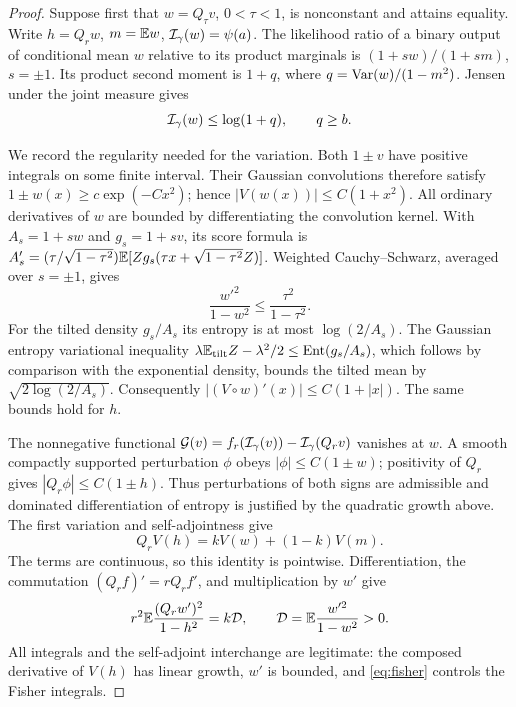 \begin{proof}
Suppose first that $w=Q_\tau v$, $0<\tau<1$, is nonconstant and
attains equality. Write $h=Q_rw$, $m=\mathbb E w$, $\mathcal I_\gamma(w)=\psi(a)$.
The likelihood ratio of a binary output of conditional mean $w$ relative
to its product marginals is $(1+sw)/(1+sm)$, $s=\pm1$.
Its product second moment is $1+q$, where
$q=\operatorname{Var}(w)/(1-m^2)$. Jensen under the joint measure gives
\begin{equation}\label{eq:likelihood}
 \mathcal I_\gamma(w)\le\log(1+q),\qquad q\ge b.
\end{equation}

We record the regularity needed for the variation. Both $1\pm v$ have
positive integrals on some finite interval. Their Gaussian convolutions
therefore satisfy $1\pm w(x)\ge c\exp(-Cx^2)$; hence
$|V(w(x))|\le C(1+x^2)$. All ordinary derivatives of $w$ are bounded
by differentiating the convolution kernel. With $A_s=1+sw$ and
$g_s=1+sv$, its score formula is
$A_s'=(\tau/\sqrt{1-\tau^2})\mathbb E[Zg_s(\tau x+\sqrt{1-\tau^2}Z)]$.
Weighted Cauchy--Schwarz, averaged over $s=\pm1$, gives
\begin{equation}\label{eq:fisher}
 \frac{w'^2}{1-w^2}\le\frac{\tau^2}{1-\tau^2}.
\end{equation}
For the tilted density $g_s/A_s$ its entropy is at most
$\log(2/A_s)$. The Gaussian entropy variational inequality
$\lambda\mathbb E_{\rm tilt}Z-\lambda^2/2\le\operatorname{Ent}(g_s/A_s)$,
which follows by comparison with the exponential density, bounds the
tilted mean by $\sqrt{2\log(2/A_s)}$.
Consequently $|(V\circ w)'(x)|\le C(1+|x|)$.
The same bounds hold for $h$.

The nonnegative functional
$\mathcal G(v)=f_r(\mathcal I_\gamma(v))-\mathcal I_\gamma(Q_rv)$ vanishes at $w$.
A smooth compactly supported perturbation $\phi$ obeys
$|\phi|\le C(1\pm w)$; positivity of $Q_r$ gives
$|Q_r\phi|\le C(1\pm h)$. Thus perturbations of both signs are
admissible and dominated differentiation of entropy is justified by the
quadratic growth above. The first variation and self-adjointness give
\begin{equation}\label{eq:euler}
 Q_rV(h)=kV(w)+(1-k)V(m).
\end{equation}
The terms are continuous, so this identity is pointwise.
Differentiation, the commutation $(Q_rf)'=rQ_rf'$, and multiplication
by $w'$ give
\begin{equation}\label{eq:energygauss}
 r^2\mathbb E\frac{(Q_rw')^2}{1-h^2}=k\mathcal D,
 \qquad \mathcal D=\mathbb E\frac{w'^2}{1-w^2}>0.
\end{equation}
All integrals and the self-adjoint interchange are legitimate: the
composed derivative of $V(h)$ has linear growth, $w'$ is bounded,
and \eqref{eq:fisher} controls the Fisher integrals.


\end{proof}
